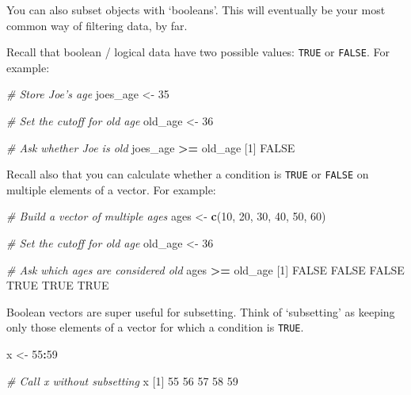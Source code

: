 \documentclass[
]{book}
\newenvironment{Shaded}{\begin{snugshade}}{\end{snugshade}}
\newcommand{\CommentTok}[1]{\textcolor[rgb]{0.56,0.35,0.01}{\textit{#1}}}
\newcommand{\DecValTok}[1]{\textcolor[rgb]{0.00,0.00,0.81}{#1}}
\newcommand{\KeywordTok}[1]{\textcolor[rgb]{0.13,0.29,0.53}{\textbf{#1}}}
\newcommand{\NormalTok}[1]{#1}
\newcommand{\OperatorTok}[1]{\textcolor[rgb]{0.81,0.36,0.00}{\textbf{#1}}}
\newcommand{\OtherTok}[1]{\textcolor[rgb]{0.56,0.35,0.01}{#1}}
\newcommand{\StringTok}[1]{\textcolor[rgb]{0.31,0.60,0.02}{#1}}
\begin{document}
You can also subset objects with `booleans'. This will eventually be your most common way of filtering data, by far.

Recall that boolean / logical data have two possible values: \texttt{TRUE} or \texttt{FALSE}. For example:

\begin{Shaded}
\begin{Highlighting}[]
\CommentTok{# Store Joe's age}
\NormalTok{joes_age <-}\StringTok{ }\DecValTok{35}

\CommentTok{# Set the cutoff for old age}
\NormalTok{old_age <-}\StringTok{ }\DecValTok{36}

\CommentTok{# Ask whether Joe is old}
\NormalTok{joes_age }\OperatorTok{>=}\StringTok{ }\NormalTok{old_age}
\NormalTok{[}\DecValTok{1}\NormalTok{] }\OtherTok{FALSE}
\end{Highlighting}
\end{Shaded}

Recall also that you can calculate whether a condition is \texttt{TRUE} or \texttt{FALSE} on multiple elements of a vector. For example:

\begin{Shaded}
\begin{Highlighting}[]
\CommentTok{# Build a vector of multiple ages}
\NormalTok{ages <-}\StringTok{ }\KeywordTok{c}\NormalTok{(}\DecValTok{10}\NormalTok{, }\DecValTok{20}\NormalTok{, }\DecValTok{30}\NormalTok{, }\DecValTok{40}\NormalTok{, }\DecValTok{50}\NormalTok{, }\DecValTok{60}\NormalTok{)}

\CommentTok{# Set the cutoff for old age}
\NormalTok{old_age <-}\StringTok{ }\DecValTok{36}

\CommentTok{# Ask which ages are considered old}
\NormalTok{ages }\OperatorTok{>=}\StringTok{ }\NormalTok{old_age}
\NormalTok{[}\DecValTok{1}\NormalTok{] }\OtherTok{FALSE} \OtherTok{FALSE} \OtherTok{FALSE}  \OtherTok{TRUE}  \OtherTok{TRUE}  \OtherTok{TRUE}
\end{Highlighting}
\end{Shaded}

Boolean vectors are super useful for subsetting. Think of `subsetting' as keeping only those elements of a vector for which a condition is \texttt{TRUE}.

\begin{Shaded}
\begin{Highlighting}[]
\NormalTok{x <-}\StringTok{ }\DecValTok{55}\OperatorTok{:}\DecValTok{59}

\CommentTok{# Call x without subsetting}
\NormalTok{x}
\NormalTok{[}\DecValTok{1}\NormalTok{] }\DecValTok{55} \DecValTok{56} \DecValTok{57} \DecValTok{58} \DecValTok{59}
\end{Highlighting}
\end{Shaded}
\end{document}
